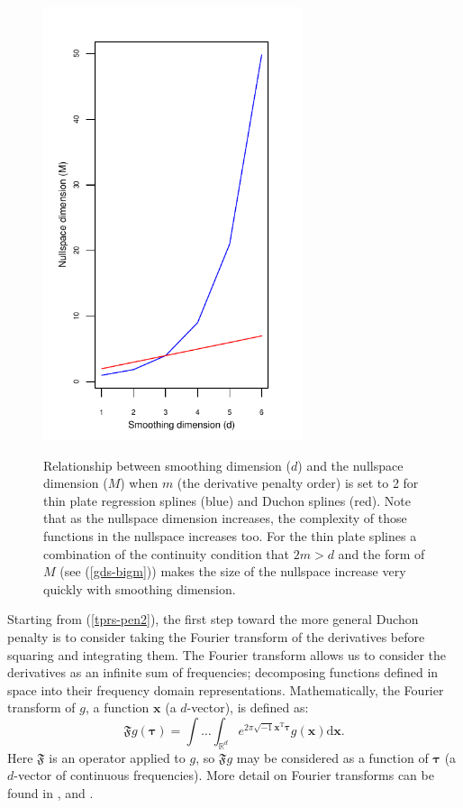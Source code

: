 \begin{figure}
\centering
\includegraphics[width=3in]{gds/figs/nullspace-dim.pdf} \\
\caption{Relationship between smoothing dimension ($d$) and the nullspace dimension ($M$) when $m$ (the derivative penalty order) is set to 2 for thin plate regression splines (blue) and Duchon splines (red). Note that as the nullspace dimension increases, the complexity of those functions in the nullspace increases too. For the thin plate splines a combination of the continuity condition that $2m>d$ and the form of $M$ (see (\ref{gds-bigm})) makes the size of the nullspace increase very quickly with smoothing dimension.}
\label{nullspace-dim}
\end{figure}

Starting from (\ref{tprs-pen2}), the first step toward the more general Duchon penalty is to consider taking the Fourier transform of the derivatives before squaring and integrating them. The Fourier transform allows us to consider the derivatives as an infinite sum of frequencies; decomposing functions defined in space into their frequency domain representations. Mathematically, the Fourier transform of $g$, a function $\mathbf{x}$ (a $d$-vector), is defined as:
\begin{equation*}
\mathfrak{F} g(\boldsymbol{\tau}) = \int \ldots \int_{\mathbb{R}^d} e^{2 \pi \sqrt{-1} \mathbf{x}^\text{T} \boldsymbol{\tau}} g(\mathbf{x}) \text{d}\mathbf{x}.
\end{equation*}
Here $\mathfrak{F}$ is an operator applied to $g$, so $\mathfrak{F}g$ may be considered as a function of $\boldsymbol{\tau}$ (a $d$-vector of continuous frequencies). More detail on Fourier transforms can be found in ,  and . 

